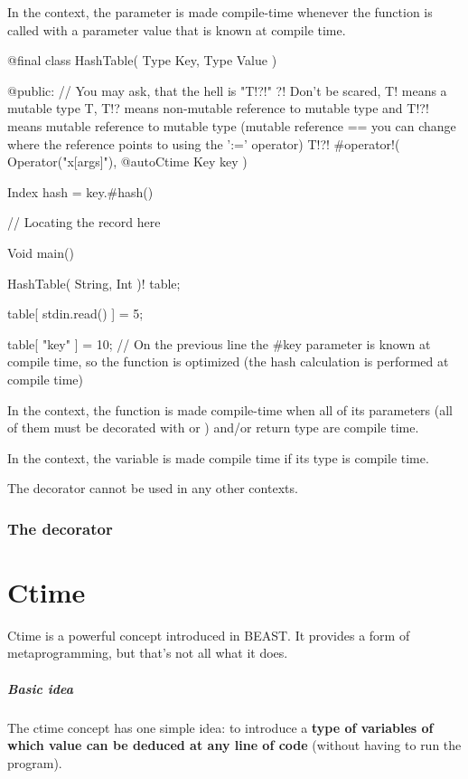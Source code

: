 In the  context, the parameter is made compile-time whenever the function is called with a parameter value that is known at compile time.
\begin{code}
@final class HashTable( Type Key, Type Value ) {

@public:
	// You may ask, that the hell is "T!?!" ?! Don't be scared, T! means a mutable type T, T!? means non-mutable reference to mutable type and T!?! means mutable reference to mutable type (mutable reference == you can change where the reference points to using the ':=' operator)
	T!?! #operator!( Operator("x[args]"), @autoCtime Key key ) {
		Index hash = key.#hash() %
		
		// Locating the record here 
	}
	
}

Void main() {
	HashTable( String, Int )! table;
	
	table[ stdin.read() ] = 5;
	
	table[ "key" ] = 10;
	// On the previous line the #key parameter is known at compile time, so the function is optimized (the hash calculation is performed at compile time)
}
\end{code}

In the  context, the function is made compile-time when all of its parameters (all of them must be decorated with  or ) and/or return type are compile time.

In the  context, the variable is made compile time if its type is compile time.

The decorator cannot be used in any other contexts.

\subsection{The  decorator} \label{decorator:noscope}

\chapter{Ctime}
Ctime is a powerful concept introduced in BEAST. It provides a form of metaprogramming, but that's not all what it does.

\paragraph{Basic idea}
The ctime concept has one simple idea: to introduce a \textbf{type of variables of which value can be deduced at any line of code} (without having to run the program).

